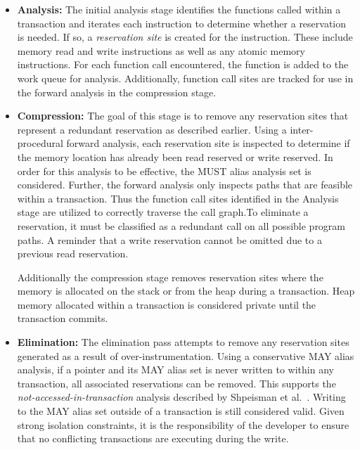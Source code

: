 \documentclass[preprint]{sigplanconf}
\begin{document}
\begin{itemize}

    \item {\bf Analysis:} The initial analysis stage identifies the functions called within a transaction and iterates each instruction to determine whether a reservation is needed. If so, a \emph{reservation site} is created for the instruction. These include memory read and write instructions as well as any atomic memory instructions. For each function call encountered, the function is added to the work queue for analysis. Additionally, function call sites are tracked for use in the forward analysis in the compression stage.

    \item {\bf Compression:} The goal of this stage is to remove any reservation sites that represent a redundant reservation as described earlier. Using a inter-procedural forward analysis, each reservation site is inspected to determine if the memory location has already been read reserved or write reserved. In order for this analysis to be effective, the MUST alias analysis set is considered. Further, the forward analysis only inspects paths that are feasible within a transaction. Thus the function call sites identified in the Analysis stage are utilized to correctly traverse the call graph.To eliminate a reservation, it must be classified as a redundant call on all possible program paths. A reminder that a write reservation cannot be omitted due to a previous read reservation.

        Additionally the compression stage removes reservation sites where the memory is allocated on the stack or from the heap during a transaction. Heap memory allocated within a transaction is considered private until the transaction commits.

    \item {\bf Elimination:} The elimination pass attempts to remove any reservation sites generated as a result of over-instrumentation. Using a conservative MAY alias analysis, if a pointer and its MAY alias set is never written to within any transaction, all associated reservations can be removed. This supports the \emph{not-accessed-in-transaction} analysis described by Shpeisman et al.~\cite{Shpeisman:2007:EIO:1250734.1250744}. Writing to the MAY alias set outside of a transaction is still considered valid. Given strong isolation constraints, it is the responsibility of the developer to ensure that no conflicting transactions are executing during the write.


\end{itemize}
\end{document}
